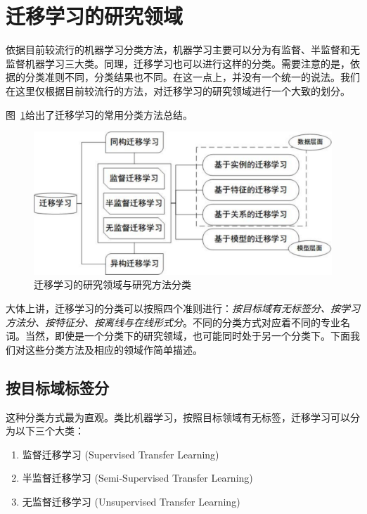 \newpage
\section{迁移学习的研究领域} %

依据目前较流行的机器学习分类方法，机器学习主要可以分为有监督、半监督和无监督机器学习三大类。同理，迁移学习也可以进行这样的分类。需要注意的是，依据的分类准则不同，分类结果也不同。在这一点上，并没有一个统一的说法。我们在这里仅根据目前较流行的方法，对迁移学习的研究领域进行一个大致的划分。

图~\ref{fig-area}给出了迁移学习的常用分类方法总结。

\begin{figure}[htbp]
	\centering
	\includegraphics[scale=0.6]{./figures/fig-area.pdf}
	\caption{迁移学习的研究领域与研究方法分类}
	\label{fig-area}
\end{figure}

大体上讲，迁移学习的分类可以按照四个准则进行：\textit{按目标域有无标签分、按学习方法分、按特征分、按离线与在线形式分}。不同的分类方式对应着不同的专业名词。当然，即使是一个分类下的研究领域，也可能同时处于另一个分类下。下面我们对这些分类方法及相应的领域作简单描述。

\subsection{按目标域标签分}
这种分类方式最为直观。类比机器学习，按照目标领域有无标签，迁移学习可以分为以下三个大类：

\begin{enumerate}
	\item 监督迁移学习 (Supervised Transfer Learning)
	\item 半监督迁移学习 (Semi-Supervised Transfer Learning)
	\item 无监督迁移学习 (Unsupervised Transfer Learning)
\end{enumerate}

